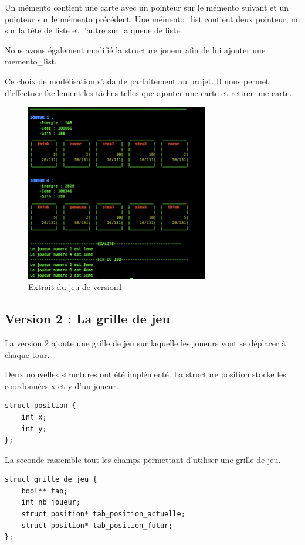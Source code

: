 \documentclass[10pt,a4paper]{article}
\begin{document}
Un mémento contient une carte avec un pointeur sur le mémento suivant et un pointeur sur le mémento précédent.
Une mémento\_list contient deux pointeur, un sur la tête de liste et l'autre sur la queue de liste. 

Nous avons également modifié la structure joueur afin de lui ajouter une memento\_list. 

Ce choix de modélisation s'adapte parfaitement au projet. Il nous permet d'effectuer facilement les tâches telles que ajouter une carte et retirer une carte. 

\begin{figure}[!h]
\centering
\includegraphics[width=8cm]{version1.png}
\caption{\label{fig:v_base}Extrait du jeu de version1}
\end{figure}

\newpage
\subsection{Version 2 : La grille de jeu}
La version 2 ajoute une grille de jeu sur laquelle les joueurs vont se déplacer à chaque tour. 

Deux nouvelles structures ont été implémenté. 
La structure position stocke les coordonnées x et y d'un joueur.
\begin{verbatim}
struct position {
    int x;
    int y;
};
\end{verbatim}

La seconde rassemble tout les champs permettant d'utiliser une grille de jeu.
\begin{verbatim}
struct grille_de_jeu {
    bool** tab;
    int nb_joueur;
    struct position* tab_position_actuelle;
    struct position* tab_position_futur;
};
\end{verbatim}
\end{document}
